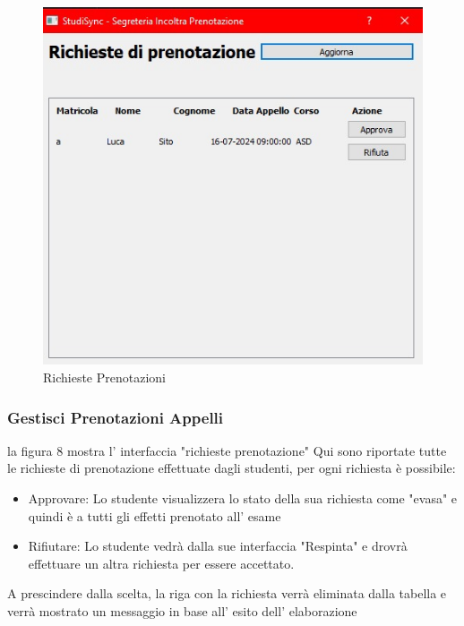 \documentclass{article}
\begin{document}
\begin{figure}
    \centering
    \includegraphics[width=1\linewidth]{IMG/RIchiestePrenotazioni.jpg}
    \caption{Richieste Prenotazioni}
    \label{fig:enter-label}
\end{figure}
\subsubsection{Gestisci Prenotazioni Appelli}
la figura 8 mostra l' interfaccia "richieste prenotazione" Qui sono riportate tutte le richieste di  prenotazione effettuate dagli studenti, per ogni richiesta è possibile:
\begin{itemize}
    \item Approvare: Lo studente visualizzera lo stato della sua richiesta come "evasa" e quindi è a tutti gli effetti prenotato all' esame
    \item Rifiutare: Lo studente vedrà dalla sue interfaccia "Respinta" e drovrà effettuare un altra richiesta per essere accettato.
\end{itemize}

A prescindere dalla scelta, la riga con la richiesta verrà eliminata dalla tabella e verrà mostrato un messaggio in base all' esito dell' elaborazione
\end{document}
